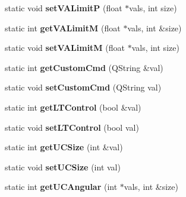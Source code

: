 \begin{DoxyCompactItemize}
\item 
\hypertarget{classRobotConf_a1b77c81fc75601bceb5959409f435d4f}{static void {\bfseries set\-V\-A\-Limit\-P} (float $\ast$vals, int size)}\label{classRobotConf_a1b77c81fc75601bceb5959409f435d4f}

\item 
\hypertarget{classRobotConf_ada0fcf76a236bc6fe715402b4dd270ee}{static int {\bfseries get\-V\-A\-Limit\-M} (float $\ast$vals, int \&size)}\label{classRobotConf_ada0fcf76a236bc6fe715402b4dd270ee}

\item 
\hypertarget{classRobotConf_a355dfb2b8719f246be1dc82b1864a145}{static void {\bfseries set\-V\-A\-Limit\-M} (float $\ast$vals, int size)}\label{classRobotConf_a355dfb2b8719f246be1dc82b1864a145}

\item 
\hypertarget{classRobotConf_a40a608c636e981a489a2a6b28eec357d}{static int {\bfseries get\-Custom\-Cmd} (Q\-String \&val)}\label{classRobotConf_a40a608c636e981a489a2a6b28eec357d}

\item 
\hypertarget{classRobotConf_aab0e3719e16bf03651d88845d6e0c19c}{static void {\bfseries set\-Custom\-Cmd} (Q\-String val)}\label{classRobotConf_aab0e3719e16bf03651d88845d6e0c19c}

\item 
\hypertarget{classRobotConf_a9c15c4161b583c9ad7775466d600e85e}{static int {\bfseries get\-L\-T\-Control} (bool \&val)}\label{classRobotConf_a9c15c4161b583c9ad7775466d600e85e}

\item 
\hypertarget{classRobotConf_ad059681380391e79ddaf32645b379530}{static void {\bfseries set\-L\-T\-Control} (bool val)}\label{classRobotConf_ad059681380391e79ddaf32645b379530}

\item 
\hypertarget{classRobotConf_acd8a87b81d12f439c92ed3e5ca98a2ae}{static int {\bfseries get\-U\-C\-Size} (int \&val)}\label{classRobotConf_acd8a87b81d12f439c92ed3e5ca98a2ae}

\item 
\hypertarget{classRobotConf_a78da38e3a75b2d2ad4d49920a75682c6}{static void {\bfseries set\-U\-C\-Size} (int val)}\label{classRobotConf_a78da38e3a75b2d2ad4d49920a75682c6}

\item 
\hypertarget{classRobotConf_a11e2e4e5a1749e2deb1e2d4b9fe04b32}{static int {\bfseries get\-U\-C\-Angular} (int $\ast$vals, int \&size)}\label{classRobotConf_a11e2e4e5a1749e2deb1e2d4b9fe04b32}


\end{DoxyCompactItemize}
